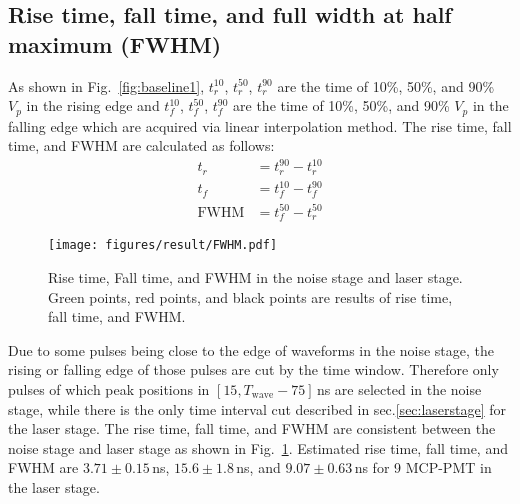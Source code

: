\subsection{Rise time, fall time, and full width at half maximum (FWHM)}
As shown in Fig.~\ref{fig:baseline1}, $t^{10}_r$, $t^{50}_r$, $t^{90}_r$ are the time of 10\%, 50\%, and 90\% $V_p$ in the rising edge and $t^{10}_f$, $t^{50}_f$, $t^{90}_f$ are the time of 10\%, 50\%, and 90\% $V_p$ in the falling edge which are acquired via linear interpolation method. The rise time, fall time, and FWHM are calculated as follows:
\begin{align}
    t_r &= t^{90}_r - t^{10}_r\\
    t_f &= t^{10}_f - t^{90}_f\\
    \mathrm{FWHM} &= t^{50}_f - t^{50}_r
\end{align}
\begin{figure}[!htbp]
    \centering
    \texttt{[image: figures/result/FWHM.pdf]}
    \caption{Rise time, Fall time, and FWHM in the noise stage and laser stage. Green points, red points, and black points are results of rise time, fall time, and FWHM.}
    \label{fig:RiseCompare}
\end{figure}
Due to some pulses being close to the edge of waveforms in the noise stage, the rising or falling edge of those pulses are cut by the time window. Therefore only pulses of which peak positions in $[15, T_{\mathrm{wave}}-75]$\,ns are selected in the noise stage, while there is the only time interval cut described in sec.\ref{sec:laserstage} for the laser stage.
 The rise time, fall time, and FWHM are consistent between the noise stage and laser stage as shown in Fig.~\ref{fig:RiseCompare}. Estimated rise time, fall time, and FWHM are $3.71\pm0.15$\,ns, $15.6\pm1.8$\,ns, and $9.07\pm0.63$\,ns for 9 MCP-PMT in the laser stage.


